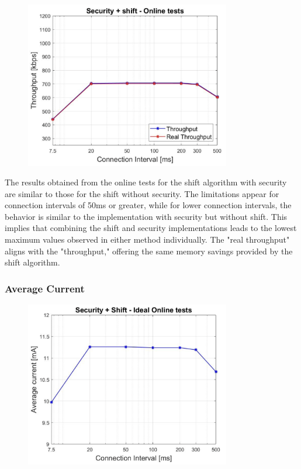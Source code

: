 \documentclass{Configuration_Files/PoliMi3i_thesis}
\begin{document}
\begin{figure}[H]
    \centering
    \includegraphics[width=0.8\textwidth]{Results Manuel/figure23}
    \label{fig:figure1}
\end{figure}

The results obtained from the online tests for the shift algorithm with security are similar to those for the shift without security. The limitations appear for connection intervals of 50ms or greater, while for lower connection intervals, the behavior is similar to the implementation with security but without shift. This implies that combining the shift and security implementations leads to the lowest maximum values observed in either method individually. The "real throughput" aligns with the "throughput," offering the same memory savings provided by the shift algorithm.

\subsubsection*{Average Current}

\begin{figure}[H]
    \centering
    \includegraphics[width=0.8\textwidth]{Results Manuel/figure24}
    \label{fig:figure1}
\end{figure}
\end{document}
